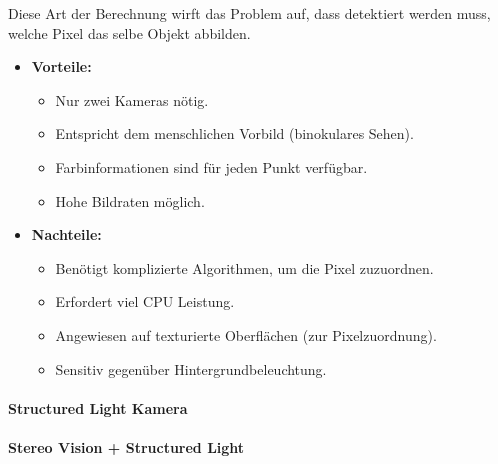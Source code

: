 					Diese Art der Berechnung wirft das Problem auf, dass detektiert werden muss, welche Pixel das selbe Objekt abbilden.

					\begin{itemize}
						\item \textbf{Vorteile:}
							\begin{itemize}
								\item Nur zwei Kameras nötig.
								\item Entspricht dem menschlichen Vorbild (binokulares Sehen).
								\item Farbinformationen sind für jeden Punkt verfügbar.
								\item Hohe Bildraten möglich.
							\end{itemize}
						\item \textbf{Nachteile:}
							\begin{itemize}
								\item Benötigt komplizierte Algorithmen, um die Pixel zuzuordnen.
								\item Erfordert viel CPU Leistung.
								\item Angewiesen auf texturierte Oberflächen (zur Pixelzuordnung).
								\item Sensitiv gegenüber Hintergrundbeleuchtung.
							\end{itemize}
					\end{itemize}

				\paragraph{Structured Light Kamera} %

				\paragraph{Stereo Vision + Structured Light} %

